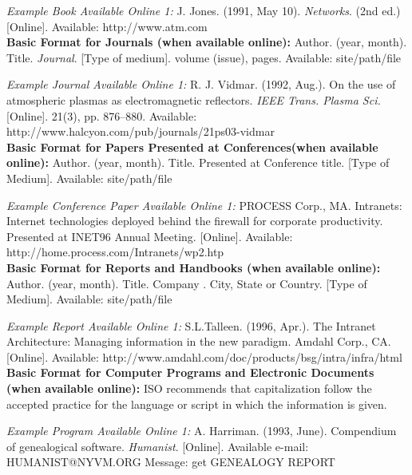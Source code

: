 \documentclass[journal]{IEEEtran}
\begin{document}
\begin{thebibliography}{1}
	 \textit{Example Book Available Online 1:} J. Jones. (1991, May 10). \textit{Networks}. (2nd ed.) [Online]. Available: http://www.atm.com\\
	
	 \textbf{Basic Format for Journals (when available online):} Author. (year, month). Title. \textit{Journal}. [Type of medium]. volume (issue), pages. Available: site/path/file 
	
	 \textit{Example Journal Available Online 1:} R. J. Vidmar. (1992,  Aug.).  On  the  use  of  atmospheric plasmas as electromagnetic reflectors. \textit{IEEE Trans. Plasma Sci.} [Online]. 21(3), pp. 876–880. Available: http://www.halcyon.com/pub/journals/21ps03-vidmar\\
	
	 \textbf{Basic Format for Papers Presented at Conferences(when available online):} Author. (year, month). Title. Presented at Conference title. [Type of Medium]. Available: site/path/file
	
	 \textit{Example Conference Paper Available Online 1:} PROCESS  Corp.,  MA.  Intranets:  Internet  technologies deployed behind the firewall for corporate productivity. Presented at 
	INET96 Annual Meeting. [Online]. Available:  http://home.process.com/Intranets/wp2.htp\\
	
	 \textbf{Basic Format for Reports and Handbooks (when available online):} Author.   (year,   month).   Title. Company . City, State or Country. [Type of Medium]. Available: site/path/file
	
	 \textit{Example Report Available Online 1:}  S.L.Talleen. (1996, Apr.). The Intranet  Architecture:  Managing  information  in  the  new paradigm. Amdahl Corp., CA. [Online]. Available: http://www.amdahl.com/doc/products/bsg/intra/infra/html\\
	
	 \textbf{Basic Format for Computer Programs and Electronic Documents (when available online):} ISO recommends that capitalization follow the accepted practice for the language or script in which the information is given.
	
	\textit{Example Program Available Online 1:} A. Harriman. (1993, June). Compendium of genealogical software. \textit{Humanist}. [Online]. Available e-mail: HUMANIST@NYVM.ORG Message: get GENEALOGY REPORT\\
	

\end{thebibliography}
\end{document}
